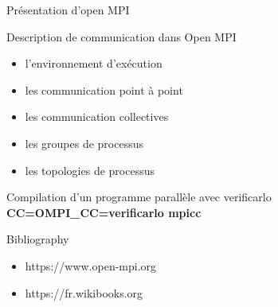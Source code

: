 \documentclass{beamer}
\begin{document}
\begin{frame}{Présentation d'open MPI}
    \begin{block}{Description de communication dans Open MPI}
      \begin{itemize}
          \item l’environnement d’exécution
          \item les communication point à point
          \item les communication collectives
          \item les groupes de processus
          \item les topologies de processus
      \end{itemize}
    \end{block}
    
    \begin{block}{Compilation d’un programme parallèle avec verificarlo}
      \textbf{CC=OMPI\_CC=verificarlo mpicc}
    \end{block}
    \begin{block}{Bibliography}
        \begin{itemize}
            \item https://www.open-mpi.org
            \item https://fr.wikibooks.org
        \end{itemize}      
    \end{block}
\end{frame}
\end{document}
